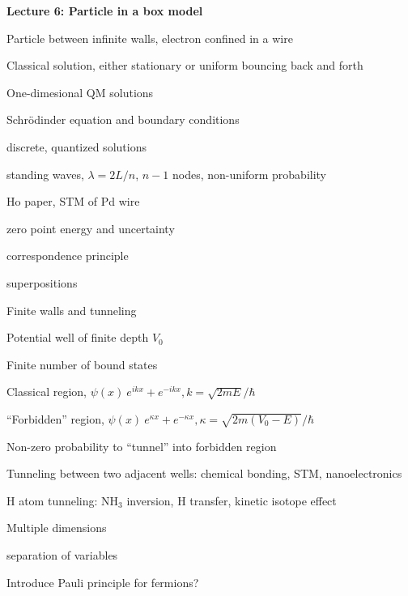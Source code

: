 \documentclass[11pt]{article}
\begin{document}
\begin{outline}
\item{{\bf Lecture 6: Particle in a box model}}
  \begin{outline}
 \item{Particle between infinite walls, electron confined in a wire}
 \item Classical solution, either stationary or uniform bouncing back and forth
  \item{One-dimesional QM solutions}
    \begin{outline}
    \item Schr\"{o}dinder equation and boundary conditions
    \item discrete, quantized solutions
     \item standing waves, $\lambda=2 L/n$, $n-1$ nodes, non-uniform probability
      \item Ho paper, STM of Pd wire
      \item zero point energy and uncertainty
      \item correspondence principle
      \item superpositions
    \end{outline}
  \item{Finite walls and tunneling}
    \begin{outline}
    \item Potential well of finite depth $V_0$
    \item Finite number of bound states
    \item Classical region, $\psi(x) ~ e^{ikx}+e^{-ikx}, k=\sqrt{2mE}/\hbar$
    \item ``Forbidden'' region, $\psi(x) ~ e^{\kappa x}+e^{-\kappa x},
      \kappa=\sqrt{2m(V_0-E)}/\hbar$
    \item Non-zero probability to ``tunnel'' into forbidden region
    \item Tunneling between two adjacent wells: chemical bonding, STM, nanoelectronics
    \item H atom tunneling: NH$_3$ inversion, H transfer, kinetic isotope effect
    \end{outline}

  \item{Multiple dimensions}
    \begin{outline}
    \item separation of variables
    \end{outline}
  \item Introduce Pauli principle for fermions?


\end{outline}
\end{outline}
\end{document}
